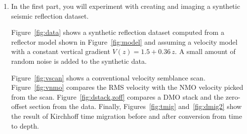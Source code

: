 \begin{enumerate}
\item In the first part, you will experiment with creating and 
  imaging a synthetic seismic reflection dataset.



Figure~\ref{fig:data} shows a synthetic reflection dataset computed
from a reflector model shown in Figure~\ref{fig:model} and assuming a
velocity model with a constant vertical gradient $V(z) = 1.5 +
0.36\,z$. A small amount of random noise is added to the synthetic data.

Figure~\ref{fig:vscan} shows a conventional velocity semblance
scan. Figure~\ref{fig:vnmo} compares the RMS velocity with the NMO
velocity picked from the scan. Figure~\ref{fig:dstack,zoff} compares a
DMO stack and the zero-offset section from the data. Finally,
Figures~\ref{fig:tmig} and~\ref{fig:dmig2} show the result of
Kirchhoff time migration before and after conversion from time to
depth.


\end{enumerate}
